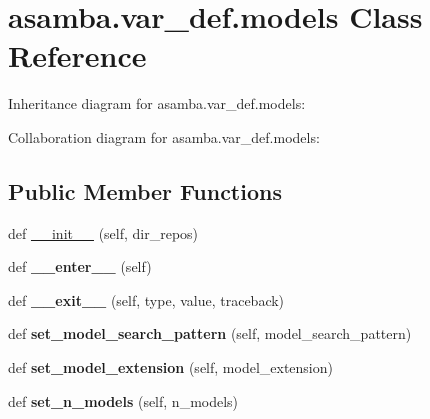 \hypertarget{classasamba_1_1var__def_1_1models}{}\section{asamba.\+var\+\_\+def.\+models Class Reference}
\label{classasamba_1_1var__def_1_1models}


Inheritance diagram for asamba.\+var\+\_\+def.\+models\+:


Collaboration diagram for asamba.\+var\+\_\+def.\+models\+:
\subsection*{Public Member Functions}
\begin{DoxyCompactItemize}
\item 
def \hyperlink{classasamba_1_1var__def_1_1models_a21b6a3b0d85fafe41208098a03fcf7ab}{\+\_\+\+\_\+init\+\_\+\+\_\+} (self, dir\+\_\+repos)
\item 
\mbox{\label{classasamba_1_1var__def_1_1models_afcc52884c26aac2e9aa85eecc38119b6}} 
def {\bfseries \+\_\+\+\_\+enter\+\_\+\+\_\+} (self)
\item 
\mbox{\label{classasamba_1_1var__def_1_1models_ad3911bafbf1ffbe6c7357ce0762b47c8}} 
def {\bfseries \+\_\+\+\_\+exit\+\_\+\+\_\+} (self, type, value, traceback)
\item 
\mbox{\label{classasamba_1_1var__def_1_1models_a0701c4b198d774b5a54aa378e25779f6}} 
def {\bfseries set\+\_\+model\+\_\+search\+\_\+pattern} (self, model\+\_\+search\+\_\+pattern)
\item 
\mbox{\label{classasamba_1_1var__def_1_1models_a2827d4182c5d3a85bf559daaca81bec3}} 
def {\bfseries set\+\_\+model\+\_\+extension} (self, model\+\_\+extension)
\item 
\mbox{\label{classasamba_1_1var__def_1_1models_a0f23ccd6f783e5c3e5878d6efd5a5fd5}} 
def {\bfseries set\+\_\+n\+\_\+models} (self, n\+\_\+models)
\item 
\mbox{\label{classasamba_1_1var__def_1_1models_a6d42985357f164d32ae57a6b38b267e7}} 

\end{DoxyCompactItemize}
